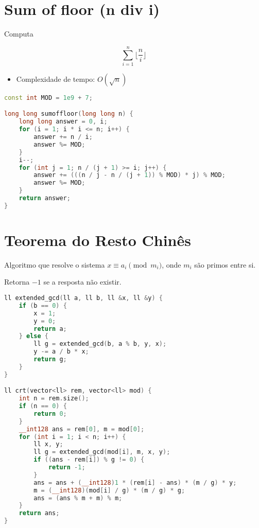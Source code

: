 \documentclass[11pt, a4paper, oneside]{book}
\begin{document}
\hfill

\section{Sum of floor (n div i)}


Computa



$$ \sum_{i=1}^{n} \lfloor\frac{n}{i}\rfloor $$





\begin{itemize}
\item Complexidade de tempo: $O(\sqrt{n})$
\end{itemize}

\hfill

\begin{multicols}{2}
\begin{lstlisting}[language=C++]
const int MOD = 1e9 + 7;

long long sumoffloor(long long n) {
    long long answer = 0, i;
    for (i = 1; i * i <= n; i++) {
        answer += n / i;
        answer %= MOD;
    }
    i--;
    for (int j = 1; n / (j + 1) >= i; j++) {
        answer += (((n / j - n / (j + 1)) % MOD) * j) % MOD;
        answer %= MOD;
    }
    return answer;
}
\end{lstlisting}
\end{multicols}

\hfill

\section{Teorema do Resto Chinês}


Algoritmo que resolve o sistema $x \equiv a_i \pmod{m_i}$, onde $m_i$ são primos entre si.



Retorna $-1$ se a resposta não existir.

\hfill

\begin{multicols}{2}
\begin{lstlisting}[language=C++]
ll extended_gcd(ll a, ll b, ll &x, ll &y) {
    if (b == 0) {
        x = 1;
        y = 0;
        return a;
    } else {
        ll g = extended_gcd(b, a % b, y, x);
        y -= a / b * x;
        return g;
    }
}

ll crt(vector<ll> rem, vector<ll> mod) {
    int n = rem.size();
    if (n == 0) {
        return 0;
    }
    __int128 ans = rem[0], m = mod[0];
    for (int i = 1; i < n; i++) {
        ll x, y;
        ll g = extended_gcd(mod[i], m, x, y);
        if ((ans - rem[i]) % g != 0) {
            return -1;
        }
        ans = ans + (__int128)1 * (rem[i] - ans) * (m / g) * y;
        m = (__int128)(mod[i] / g) * (m / g) * g;
        ans = (ans % m + m) % m;
    }
    return ans;
}
\end{lstlisting}
\end{multicols}
\end{document}

